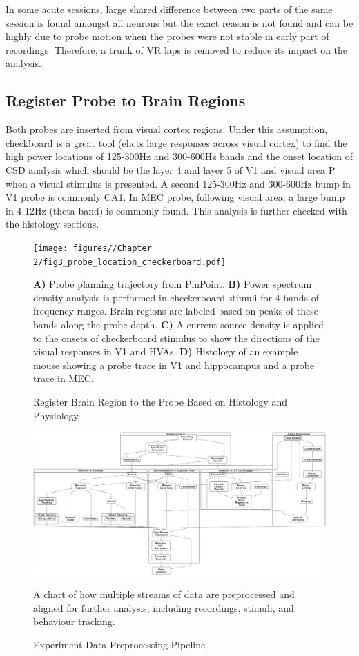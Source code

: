 In some acute sessions, large shared difference between two parts of the same session is found amongst all neurons but the exact reason is not found and can be highly due to probe motion when the probes were not stable in early part of recordings. Therefore, a trunk of VR laps is removed to reduce its impact on the analysis.

\subsection{Register Probe to Brain Regions}
Both probes are inserted from visual cortex regions. Under this assumption, checkboard is a great tool (elicts large responses across visual cortex) to find the high power locations of 125-300Hz and 300-600Hz bands and the onset location of CSD analysis which should be the layer 4 and layer 5 of V1 and visual area P when a visual stimulus is presented. A second 125-300Hz and 300-600Hz bump in V1 probe is commonly CA1. In MEC probe, following visual area, a large bump in 4-12Hz (theta band) is commonly found. This analysis is further checked with the histology sections.
\begin{figure}
    \centering
    \texttt{[image: figures//Chapter 2/fig3\_probe\_location\_checkerboard.pdf]}
    \caption{Register Brain Region to the Probe Based on Histology and Physiology}
    \label{fig:placeholder}
    \textbf{A)} Probe planning  trajectory from PinPoint. \textbf{B)} Power spectrum density analysis is performed in checkerboard stimuli for 4 bands of frequency ranges. Brain regions are labeled based on peaks of these bands along the probe depth. \textbf{C)} A current-source-density is applied to the onsets of checkerboard stimulus to show the directions of the visual responses in V1 and HVAs. \textbf{D)} Histology of an example mouse showing a probe trace in V1 and hippocampus and a probe trace in  MEC.
\end{figure}


\begin{figure}
    \centering
    \includegraphics[width=1\linewidth]{figures//Chapter 2//plots/flow_chart_td.png}
    \caption{Experiment Data Preprocessing Pipeline}
    \label{fig:placeholder}

    A chart of how multiple streams of data are preprocessed and aligned for further analysis, including recordings, stimuli, and behaviour tracking.
\end{figure}

